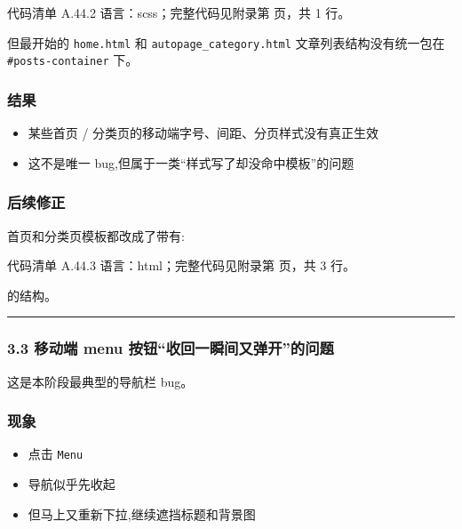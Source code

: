 \documentclass[lang=cn,scheme=chinese,color=blue,device=normal,toc=onecol,math=cm]{elegantbook}
\begin{document}
\begin{codeindexbox}{代码清单 A.44.2}
语言：scss；完整代码见附录第 \pageref{code:44:2} 页，共 1 行。
\end{codeindexbox}


但最开始的 \texttt{home.html} 和 \texttt{autopage\_\allowbreak{}category.html} 文章列表结构没有统一包在 \texttt{\#posts-container} 下。\par


\subsubsection{结果}


\begin{itemize}
\item 某些首页 /\allowbreak{} 分类页的移动端字号、间距、分页样式没有真正生效
\item 这不是唯一 bug,但属于一类“样式写了却没命中模板”的问题
\end{itemize}


\subsubsection{后续修正}


首页和分类页模板都改成了带有:\par


\begin{codeindexbox}{代码清单 A.44.3}
语言：html；完整代码见附录第 \pageref{code:44:3} 页，共 3 行。
\end{codeindexbox}


的结构。\par


\medskip\hrule\medskip


\subsubsection{3.3 移动端 menu 按钮“收回一瞬间又弹开”的问题}


这是本阶段最典型的导航栏 bug。\par


\subsubsection{现象}


\begin{itemize}
\item 点击 \texttt{Menu}
\item 导航似乎先收起
\item 但马上又重新下拉,继续遮挡标题和背景图
\end{itemize}
\end{document}
